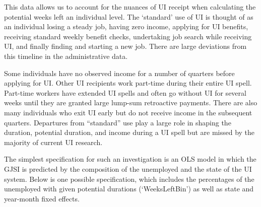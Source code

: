 \documentclass[12pt]{article}
\begin{document}
\begin{spacing}{2}
\begin{appendix}
\begin{spacing}{2}
This data allows us to account for the nuances of UI receipt when calculating the potential weeks left an individual level. The `standard' use of UI is thought of as an individual losing a steady job, having zero income, applying for UI benefits, receiving standard weekly benefit checks, undertaking job search while receiving UI, and finally finding and starting a new job. There are large deviations from this timeline in the administrative data.

Some individuals have no observed income for a number of quarters before applying for UI. Other UI recipients work part-time during their entire UI spell. Part-time workers have extended UI spells and often go without UI for several weeks until they are granted large lump-sum retroactive payments. There are also many individuals who exit UI early but do not receive income in the subsequent quarters. Departures from ``standard'' use play a large role in shaping the duration, potential duration, and income during a UI spell but are missed by the majority of current UI research.\footnotemark \

The simplest specification for such an investigation is an OLS model in which the GJSI is predicted by the composition of the unemployed and the state of the UI system. Below is one possible specification, which includes the percentages of the unemployed with given potential durations (`WeeksLeftBin') as well as state and year-month fixed effects.


\end{spacing}
\end{appendix}
\end{spacing}
\end{document}
